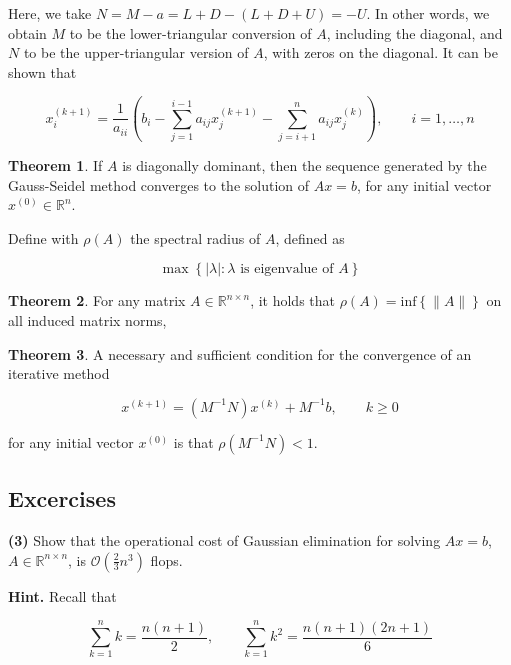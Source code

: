 \documentclass[12pt]{article}
\theoremstyle{definition}
\newtheorem{theorem}{Theorem}
\begin{document}
Here, we take $N = M - a = L + D - (L + D + U) = -U$. In other words, we obtain 
$M$ to be the lower-triangular conversion of $A$, including the diagonal, and
$N$ to be the upper-triangular version of $A$, with zeros on the diagonal. It
can be shown that 

\begin{equation*}
    x_i^{(k+1)} = \frac{1}{a_{ii}} \left( b_i - \sum_{j=1}^{i-1}
    a_{ij}x_j^{(k+1)} - \sum_{j=i+1}^n a_{ij} x_j^{(k)}\right), \qquad i = 1,
    \ldots, n
\end{equation*}

\begin{theorem}
    If $A$ is diagonally dominant, then the sequence generated by the
    Gauss-Seidel method converges to the solution of $Ax = b$, for any 
    initial vector $x^{(0)} \in \mathbb{R}^n$.
\end{theorem}

Define with $\rho(A)$ the spectral radius of $A$, defined as 

\begin{equation*}
    \max \left\{ |\lambda| : \lambda \text{ is eigenvalue of } A \right\} 
\end{equation*}

\begin{theorem}
    For any matrix $A \in \mathbb{R}^{n\times n}$, it holds that 
    $\rho(A) = \text{inf}\left\{ \|A\| \right\} $ on all induced matrix norms, 
\end{theorem}

\begin{theorem}
    A necessary and sufficient condition for the convergence of an iterative
    method 

    \begin{equation*}
        x^{(k+1)} = (M^{-1}N)x^{(k)} + M^{-1}b, \qquad k \geq 0
    \end{equation*}

    for any initial vector $x^{(0)}$ is that $\rho\left( M^{-1}N \right) < 1$.
\end{theorem}


\pagebreak 

\subsection{Excercises}

\begin{shaded}
    \textbf{(3)} Show that the operational cost of Gaussian elimination for
    solving $Ax = b$, $A \in \mathbb{R}^{n \times n}$, is $\mathcal{O}\left(
    \frac{2}{3}n^3 \right) $ flops. 

    \textbf{Hint.} Recall that 

    \begin{equation*}
        \sum_{k=1}^n k = \frac{n(n+1)}{2}, \qquad \sum_{k=1}^n k^2 =
        \frac{n(n+1)(2n+1)}{6}
    \end{equation*}
\end{shaded}
\end{document}

